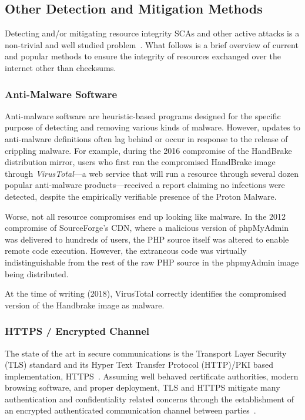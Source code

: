 \subsection{Other Detection and Mitigation Methods}

Detecting and/or mitigating resource integrity SCAs and other active attacks is
a non-trivial and well studied problem~\cite{MD5Header, HTTP1.1, HTTPS, SRI, LF,
OpenPGP1, DNSSEC, PKI}. What follows is a brief overview of current and popular
methods to ensure the integrity of resources exchanged over the internet other
than checksums.

\subsubsection{Anti-Malware Software}

Anti-malware software are heuristic-based programs designed for the specific
purpose of detecting and removing various kinds of malware. However, updates to
anti-malware definitions often lag behind or occur in response to the release of
crippling malware. For example, during the 2016 compromise of the HandBrake
distribution mirror, users who first ran the compromised HandBrake image
through \textit{VirusTotal}---a web service that will run a resource through
several dozen popular anti-malware products---received a report claiming no
infections were detected, despite the empirically verifiable presence of the
Proton Malware.

Worse, not all resource compromises end up looking like malware. In the 2012
compromise of SourceForge's CDN, where a malicious version of phpMyAdmin was
delivered to hundreds of users, the PHP source itself was altered to enable
remote code execution. However, the extraneous code was virtually
indistinguishable from the rest of the raw PHP source in the phpmyAdmin image
being distributed.

At the time of writing (2018), VirusTotal correctly identifies the compromised
version of the Handbrake image as malware.

\subsubsection{HTTPS / Encrypted Channel}

The state of the art in secure communications is the Transport Layer Security
(TLS) standard and its Hyper Text Transfer Protocol (HTTP)/PKI based
implementation, HTTPS~\cite{TLS1.2, HTTPS, PKI}. Assuming well behaved
certificate authorities, modern browsing software, and proper deployment, TLS
and HTTPS mitigate many authentication and confidentiality related concerns
through the establishment of an encrypted authenticated communication channel
between parties~\cite{HTTPS, TLS1.2, DTLS}.

